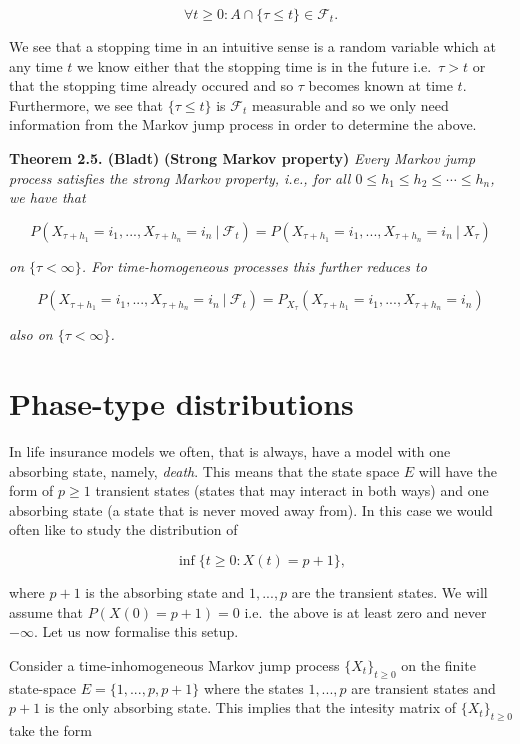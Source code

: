 \documentclass[a4paper,10pt,openany]{book}
\begin{document}
\[
\forall t\ge 0 : A\cap \{\tau\le t\}\in\mathcal{F}_t.
\]

We see that a stopping time in an intuitive sense is a random variable which at any time \(t\) we know either that the stopping time is in the future i.e.~\(\tau > t\) or that the stopping time already occured and so \(\tau\) becomes known at time \(t\). Furthermore, we see that \(\{\tau \le t\}\) is \(\mathcal{F}_t\) measurable and so we only need information from the Markov jump process in order to determine the above.

\textbf{Theorem 2.5. (Bladt)} \textbf{(Strong Markov property)} \emph{Every Markov jump process satisfies the strong Markov property, i.e., for all \(0\le h_1\le h_2\le \cdots \le h_n\), we have that}

\[
P(X_{\tau +h_1}=i_1,...,X_{\tau + h_n}=i_n\ \vert\ \mathcal{F}_t)=P(X_{\tau +h_1}=i_1,...,X_{\tau + h_n}=i_n\ \vert\ X_\tau)
\]

\emph{on \(\{\tau <\infty\}\). For time-homogeneous processes this further reduces to}

\[
P(X_{\tau +h_1}=i_1,...,X_{\tau + h_n}=i_n\ \vert\ \mathcal{F}_t)=P_{X_\tau}(X_{\tau +h_1}=i_1,...,X_{\tau + h_n}=i_n)
\]

\emph{also on \(\{\tau <\infty\}\).}

\hypertarget{phase-type-distributions}{%
\section{Phase-type distributions}\label{phase-type-distributions}}

In life insurance models we often, that is always, have a model with one absorbing state, namely, \emph{death}. This means that the state space \(E\) will have the form of \(p\ge 1\) transient states (states that may interact in both ways) and one absorbing state (a state that is never moved away from). In this case we would often like to study the distribution of

\[
\inf\{t\ge 0 : X(t)=p+1\},
\]

where \(p+1\) is the absorbing state and \(1,...,p\) are the transient states. We will assume that \(P(X(0)=p+1)=0\) i.e.~the above is at least zero and never \(-\infty\). Let us now formalise this setup.

Consider a time-inhomogeneous Markov jump process \(\{X_t\}_{t\ge 0}\) on the finite state-space \(E=\{1,...,p,p+1\}\) where the states \(1,...,p\) are transient states and \(p+1\) is the only absorbing state. This implies that the intesity matrix of \(\{X_t\}_{t\ge 0}\) take the form
\end{document}
